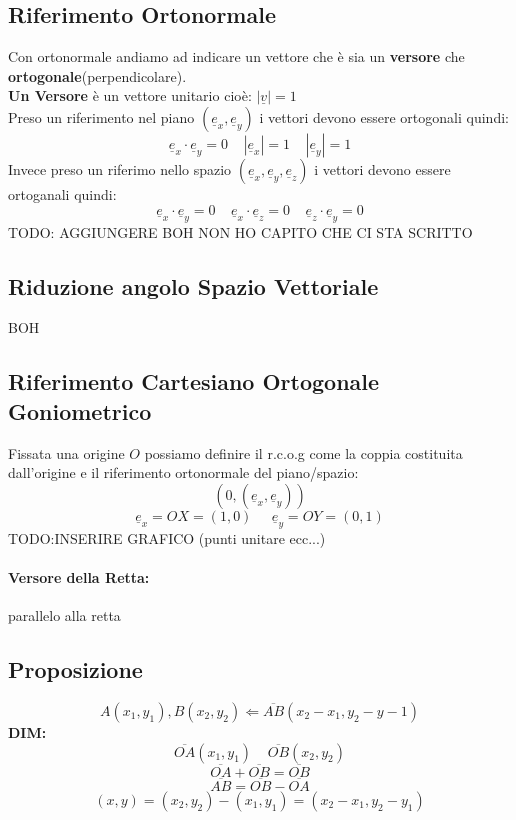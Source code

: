 \subsection{Riferimento Ortonormale}
Con ortonormale andiamo ad indicare un vettore che è sia un \textbf{versore} che \textbf{ortogonale}(perpendicolare).\\
\textbf{Un Versore} è un vettore unitario cioè: $|\underline{v}| = 1$ \\
Preso un riferimento nel piano $(\underline{e}_x, \underline{e}_y)$ i vettori devono essere ortogonali quindi:
$$ \underline{e}_x \cdot \underline{e}_y = 0 \;\;\;\; |\underline{e}_x|=1 \;\;\;\; |\underline{e}_y|=1 $$ 
Invece preso un riferimo nello spazio $(\underline{e}_x,\underline{e}_y,\underline{e}_z)$ i vettori devono essere ortoganali quindi:
$$ \underline{e}_x \cdot \underline{e}_y = 0 \;\;\;\; \underline{e}_x \cdot \underline{e}_z = 0 \;\;\;\; \underline{e}_z \cdot \underline{e}_y = 0 $$
TODO: AGGIUNGERE BOH NON HO CAPITO CHE CI STA SCRITTO

\subsection{Riduzione angolo Spazio Vettoriale}
BOH

\subsection{Riferimento Cartesiano Ortogonale Goniometrico}
Fissata una origine $O$ possiamo definire il r.c.o.g come la coppia costituita dall'origine e il riferimento ortonormale del piano/spazio:
$$ (0,(\underline{e}_x,\underline{e}_y)) $$
$$ \underline{e}_x = OX = (1,0) \;\;\;\;\; \underline{e}_y = OY = (0,1) $$
TODO:INSERIRE GRAFICO (punti unitare ecc...)

\paragraph{Versore della Retta:} parallelo alla retta

\subsection{Proposizione}
$$ A(x_1,y_1), B(x_2,y_2) \Leftarrow \overline{AB}(x_2-x_1, y_2-y-1) $$
\textbf{DIM:}
$$ \overline{OA}(x_1,y_1) \;\;\;\; \overline{OB}(x_2,y_2) $$
$$ \overline{OA}+\overline{OB} = \overline{OB}$$
$$ \overline{AB} = \overline{OB} - \overline{OA} $$
$$ (x,y) = (x_2,y_2)-(x_1,y_1) = (x_2-x_1, y_2-y_1) $$

